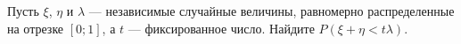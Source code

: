 \documentclass{article}
\begin{document}
Пусть $\xi$, $\eta$ и $\lambda$ --- независимые случайные величины, равномерно распределенные на отрезке $[0;1]$, а $t$ --- фиксированное число. Найдите $P(\xi + \eta < t\lambda)$.
\end{document}

